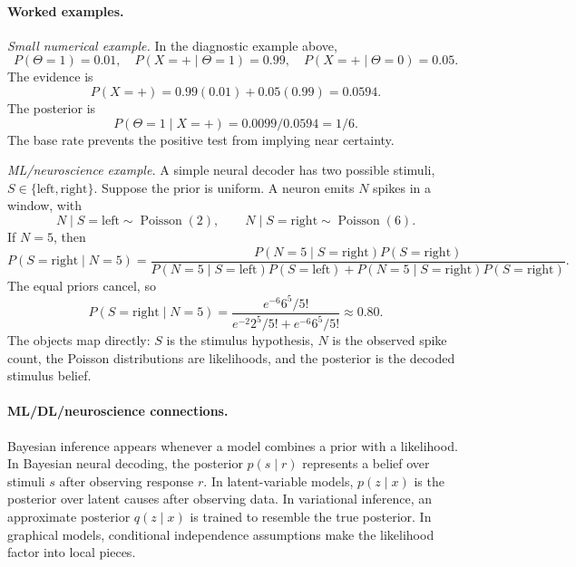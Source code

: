 \paragraph{Worked examples.}
\emph{Small numerical example.} In the diagnostic example above,
\[
P(\Theta=1)=0.01,\quad
P(X=+\mid \Theta=1)=0.99,\quad
P(X=+\mid \Theta=0)=0.05.
\]
The evidence is
\[
P(X=+)=0.99(0.01)+0.05(0.99)=0.0594.
\]
The posterior is
\[
P(\Theta=1\mid X=+)=0.0099/0.0594=1/6.
\]
The base rate prevents the positive test from implying near certainty.

\emph{ML/neuroscience example.} A simple neural decoder has two possible stimuli, \(S\in\{\mathrm{left},\mathrm{right}\}\). Suppose the prior is uniform. A neuron emits \(N\) spikes in a window, with
\[
N\mid S=\mathrm{left}\sim\operatorname{Poisson}(2),
\qquad
N\mid S=\mathrm{right}\sim\operatorname{Poisson}(6).
\]
If \(N=5\), then
\[
P(S=\mathrm{right}\mid N=5)
=
\frac{P(N=5\mid S=\mathrm{right})P(S=\mathrm{right})}
{P(N=5\mid S=\mathrm{left})P(S=\mathrm{left})
+P(N=5\mid S=\mathrm{right})P(S=\mathrm{right})}.
\]
The equal priors cancel, so
\[
P(S=\mathrm{right}\mid N=5)
=
\frac{e^{-6}6^5/5!}{e^{-2}2^5/5!+e^{-6}6^5/5!}
\approx 0.80.
\]
The objects map directly: \(S\) is the stimulus hypothesis, \(N\) is the observed spike count, the Poisson distributions are likelihoods, and the posterior is the decoded stimulus belief.

\paragraph{ML/DL/neuroscience connections.}
Bayesian inference appears whenever a model combines a prior with a likelihood. In Bayesian neural decoding, the posterior \(p(s\mid r)\) represents a belief over stimuli \(s\) after observing response \(r\). In latent-variable models, \(p(z\mid x)\) is the posterior over latent causes after observing data. In variational inference, an approximate posterior \(q(z\mid x)\) is trained to resemble the true posterior. In graphical models, conditional independence assumptions make the likelihood factor into local pieces.

